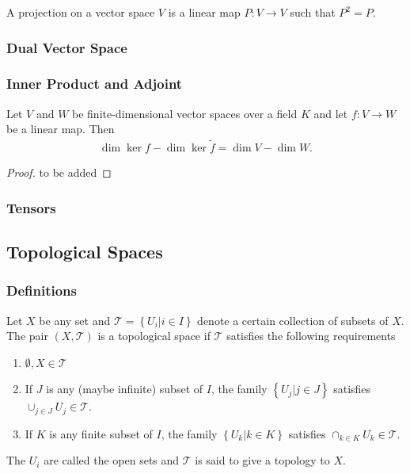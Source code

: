 \documentclass[10pt]{article}
\begin{document}
\begin{definition}[Projection]
    A projection on a vector space $V$ is a linear map $P:V\to V$ such that $P^2=P$.
\end{definition}

\subsubsection{Dual Vector Space}

\subsubsection{Inner Product and Adjoint}
\begin{theorem}
    Let $V$ and $W$ be finite-dimensional vector spaces over a field $K$ and let $f:V\to W$ be a linear map.
    Then
    \begin{align}
        \dim\ker f-\dim\ker\tilde{f}=\dim V-\dim W.
    \end{align}
\end{theorem}
\begin{proof}
    to be added
\end{proof}

\subsubsection{Tensors}

\subsection{Topological Spaces}
\subsubsection{Definitions}
\begin{definition}
    Let $X$ be any set and $\mathcal{T}=\left\{U_i\vert i\in I\right\}$ denote a certain collection of subsets of $X$.
    The pair $(X,\mathcal{T})$ is a topological space if $\mathcal{T}$ satisfies the following requirements
    \begin{enumerate}
        \item $\emptyset,X\in\mathcal{T}$
        \item If $J$ is any (maybe infinite) subset of $I$, the family $\left\{U_j\vert j\in J\right\}$ satisfies $\cup_{j\in J}U_j\in \mathcal{T}$.
        \item If $K$ is any finite subset of $I$, the family $\left\{U_k\vert k\in K\right\}$ satisfies $\cap_{k\in K}U_k\in\mathcal{T}$.
    \end{enumerate}
    The $U_i$ are called the open sets and $\mathcal{T}$ is said to give a topology to $X$.
\end{definition}
\end{document}
